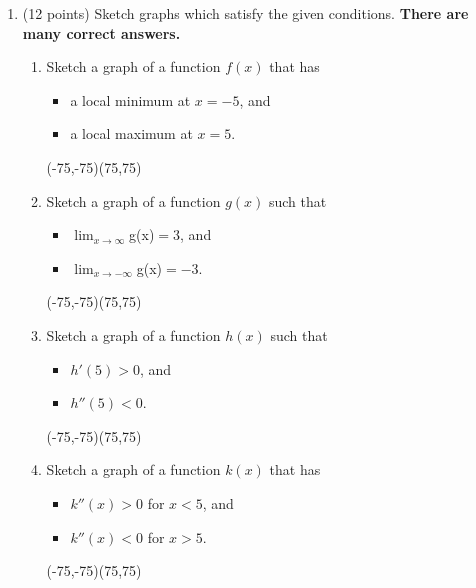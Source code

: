 \documentclass[12pt]{article}
\begin{document}
\newpage
\begin{enumerate}
\item (12 points) Sketch graphs which satisfy the given conditions. \textbf{There are many correct answers.}
	\begin{multicols}{2}
	\begin{enumerate}
	\item Sketch a graph of a function $f(x)$ that has
		\begin{itemize}
		\item a local minimum at $x=-5$, and
		\item a local maximum at $x=5$.
		\end{itemize}
	\begin{center}
	\coordsys[10][10](-75,-75)(75,75)
	\end{center}

	\item Sketch a graph of a function $g(x)$ such that
		\begin{itemize}
		\item $\displaystyle \lim_{x \to \infty} $g(x)$ = 3$, and
		\item $\displaystyle \lim_{x \to -\infty} $g(x)$ = -3$.
		\end{itemize}
	\begin{center}
	\coordsys[10][10](-75,-75)(75,75)
	\end{center}
\columnbreak
	\item Sketch a graph of a function $h(x)$ such that
		\begin{itemize}
		\item $h'(5)>0$, and
		\item $h''(5)<0$.
		\end{itemize}
	\begin{center}
	\coordsys[10][10](-75,-75)(75,75)
	\end{center}

	\item Sketch a graph of a function $k(x)$ that has
		\begin{itemize}
		\item $k''(x) > 0$ for $x<5$, and
		\item $k''(x) < 0$ for $x>5$.
		\end{itemize}
	\begin{center}
	\coordsys[10][10](-75,-75)(75,75)
	\end{center}


\end{enumerate}
\end{multicols}
\end{enumerate}
\end{document}

